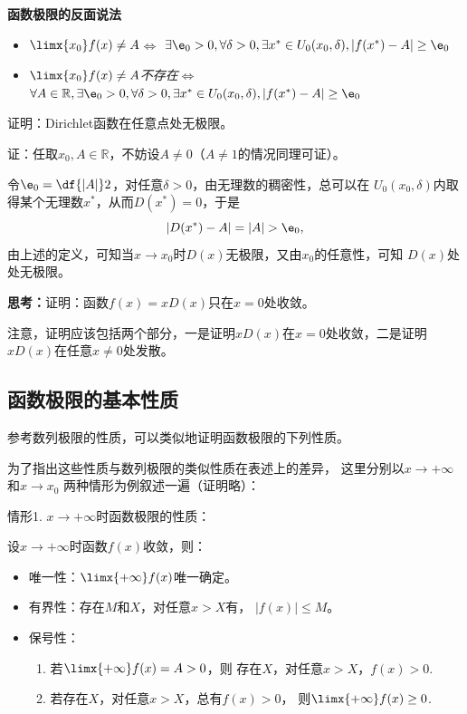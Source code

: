 \begin{shaded}
	\begin{tcolorbox}
		{\bf 函数极限的反面说法}
		\begin{itemize}
		  \item {\it $\limx{x_0}f(x)\ne A$}$\Leftrightarrow$ 
		    $\exists\e_0>0,\forall\delta>0, \exists x^*\in
		    U_0(x_0,\delta),|f(x^*)-A|\geq\e_0$ 
		  \item {\it $\limx{x_0}f(x)\ne A$不存在}$\Leftrightarrow$
			$\forall A\in\mathbb{R},\exists\e_0>0,\forall\delta>0, \exists x^*\in
		    U_0(x_0,\delta),|f(x^*)-A|\geq\e_0$ 
		\end{itemize}
	\end{tcolorbox}

	\egz 证明：Dirichlet函数在任意点处无极限。
	
	证：任取$x_0,A\in\mathbb{R}$，不妨设$A\ne 0$（$A\ne 1$的情况同理可证）。
	
	令$\e_0=\df{|A|}2$，对任意$\delta>0$，由无理数的稠密性，总可以在
	$U_0(x_0,\delta)$内取得某个无理数$x^*$，从而$D(x^*)=0$，于是
	$$|D(x^*)-A|=|A|>\e_0,$$
	由上述的定义，可知当$x\to x_0$时$D(x)$无极限，又由$x_0$的任意性，可知
	$D(x)$处处无极限。\fin

	\bs
	
	{\bf 思考：}证明：函数$f(x)=xD(x)$只在$x=0$处收敛。

	注意，证明应该包括两个部分，一是证明$xD(x)$在$x=0$处收敛，二是证明
	$xD(x)$在任意$x\ne 0$处发散。
\end{shaded}

\subsection{函数极限的基本性质}

参考数列极限的性质，可以类似地证明函数极限的下列性质。

为了指出这些性质与数列极限的类似性质在表述上的差异，
这里分别以$x\to+\infty$和$x\to x_0$
两种情形为例叙述一遍（证明略）：

{\kaishu 情形1.} $x\to+\infty$时函数极限的性质：

设$x\to+\infty$时函数$f(x)$收敛，则：
\begin{itemize}
	\setlength{\itemindent}{1cm}
	\item {\kaishu 唯一性：}$\limx{+\infty}f(x)$唯一确定。
	\item {\kaishu 有界性：}存在$M$和$X$，对任意$x>X$有，
	$|f(x)|\leq M$。
	\item {\kaishu 保号性：}
	\begin{enumerate}[(1)]
		\setlength{\itemindent}{1cm}
		\item 若$\limx{+\infty}f(x)=A>0$，则
		存在$X$，对任意$x>X$，$f(x)>0$.
		\item 若存在$X$，对任意$x>X$，总有$f(x)>0$，
		则$\limx{+\infty}f(x)\geq 0$.
	\end{enumerate}
\end{itemize}


